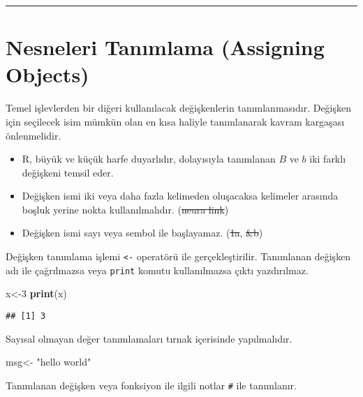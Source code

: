 \documentclass[
]{book}
\newenvironment{Shaded}{\begin{snugshade}}{\end{snugshade}}
\newcommand{\DecValTok}[1]{\textcolor[rgb]{0.00,0.00,0.81}{#1}}
\newcommand{\KeywordTok}[1]{\textcolor[rgb]{0.13,0.29,0.53}{\textbf{#1}}}
\newcommand{\NormalTok}[1]{#1}
\newcommand{\StringTok}[1]{\textcolor[rgb]{0.31,0.60,0.02}{#1}}
\begin{document}
\begin{center}\rule{0.5\linewidth}{0.5pt}\end{center}

\hypertarget{nesneleri-tanux131mlama-assigning-objects}{%
\section{Nesneleri Tanımlama (Assigning Objects)}\label{nesneleri-tanux131mlama-assigning-objects}}

Temel işlevlerden bir diğeri kullanılacak değişkenlerin tanımlanmasıdır. Değişken için seçilecek isim mümkün olan en kısa haliyle tanımlanarak kavram kargaşası önlenmelidir.

\begin{itemize}
\item
  R, büyük ve küçük harfe duyarlıdır, dolayısıyla tanımlanan \(B\) ve \(b\) iki farklı değişkeni temsil eder.
\item
  Değişken ismi iki veya daha fazla kelimeden oluşacaksa kelimeler arasında boşluk yerine nokta kullanılmalıdır. (\sout{neura link})
\item
  Değişken ismi sayı veya sembol ile başlayamaz. (\sout{1a}, \sout{\&b})
\end{itemize}

Değişken tanımlama işlemi \texttt{\textless{}-} operatörü ile gerçekleştirilir. Tanımlanan değişken adı ile çağrılmazsa veya \texttt{print} komutu kullanılmazsa çıktı yazdırılmaz.

\begin{Shaded}
\begin{Highlighting}[]
\NormalTok{x<-}\DecValTok{3}
\KeywordTok{print}\NormalTok{(x)}
\end{Highlighting}
\end{Shaded}

\begin{verbatim}
## [1] 3
\end{verbatim}

Sayısal olmayan değer tanımlamaları tırnak içerisinde yapılmalıdır.

\begin{Shaded}
\begin{Highlighting}[]
\NormalTok{msg<-}\StringTok{ "hello world"}
\end{Highlighting}
\end{Shaded}

Tanımlanan değişken veya fonksiyon ile ilgili notlar \texttt{\#} ile tanımlanır.
\end{document}
